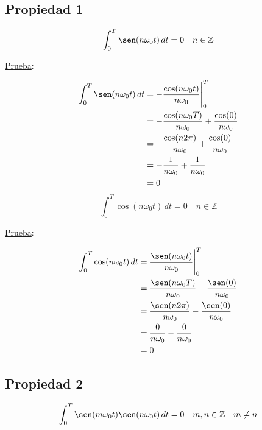 \subsection*{Propiedad 1}
\begin{equation}
    \int_{0}^{T}\sen(n\omega_0 t)\,dt=0\quad n\in\mathbb{Z}
\end{equation}

\underline{Prueba}:

\begin{equation*}
\begin{split}
    \int_{0}^{T}\sen(n\omega_0 t)\,dt
        &=-\frac{\cos(n\omega_0 t)}{n\omega_0}\Biggr|_{0}^{T}\\
        &=-\frac{\cos(n\omega_0 T)}{n\omega_0}+\frac{\cos(0)}{n\omega_0}\\
        &=-\frac{\cos(n 2\pi)}{n\omega_0}+\frac{\cos(0)}{n\omega_0}\\
        &=-\frac{1}{n\omega_0}+\frac{1}{n\omega_0}\\
        &=0\\
\end{split}
\end{equation*}
\begin{equation}
    \int_{0}^{T}\cos(n\omega_0 t)\,dt=0\quad n\in\mathbb{Z}
\end{equation}

\underline{Prueba}:

\begin{equation*}
\begin{split}
    \int_{0}^{T}\cos(n\omega_0 t)\,dt
        &=\frac{\sen(n\omega_0 t)}{n\omega_0}\Biggr|_{0}^{T}\\
        &=\frac{\sen(n\omega_0 T)}{n\omega_0}-\frac{\sen(0)}{n\omega_0}\\
        &=\frac{\sen(n 2\pi)}{n\omega_0}-\frac{\sen(0)}{n\omega_0}\\
        &=\frac{0}{n\omega_0}-\frac{0}{n\omega_0}\\
        &=0\\
\end{split}
\end{equation*}

\subsection*{Propiedad 2}
\begin{equation}
    \int_{0}^{T}\sen(m\omega_0 t)\sen(n\omega_0 t)\,dt=0
    \quad m,n \in\mathbb{Z}\quad m\neq n
\end{equation}

